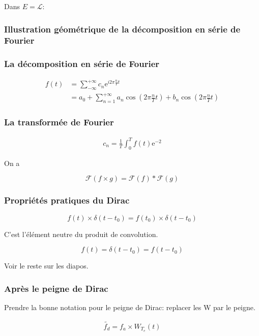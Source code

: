 \documentclass[a4paper,11pt]{article}
\newcommand{\e}{\mathrm{e}}
\begin{document}
Dans $E = \mathcal{L}$:

\subsubsection{Illustration géométrique de la décomposition en série de Fourier}

\subsubsection{La décomposition en série de Fourier}

\begin{align*}
  f(t) &= \sum^{+ \infty}_{- \infty} c_n \e ^{i 2 \pi \frac{n}{T} t}\\
       &= a_0 + \sum^{+ \infty}_{n = 1} a_n \cos(2 \pi \frac{n}{T} t) + b_n \cos(2 \pi \frac{n}{T} t)
\end{align*}

\subsubsection{La transformée de Fourier}

\begin{align*}
  c_n = \frac{1}{T} \int_0^T f(t) \e ^{-2}
\end{align*}

On a

$$ \mathcal{F}(f \times g) = \mathcal{F}(f) * \mathcal{F}(g) $$

\subsubsection{Propriétés pratiques du Dirac}

$$f(t) \times \delta(t - t_0) = f(t_0) \times \delta (t - t_0) $$

C'est l'élément neutre du produit de convolution.

$$ f(t) = \delta (t - t_0) = f(t - t_0) $$

Voir le reste sur les diapos.

\subsubsection{Après le peigne de Dirac}

Prendre la bonne notation pour le peigne de Dirac: replacer les W par le peigne.

\begin{align*}
  \tilde{f_d} = f_a \times W_{T_e} (t)
\end{align*}
\end{document}
